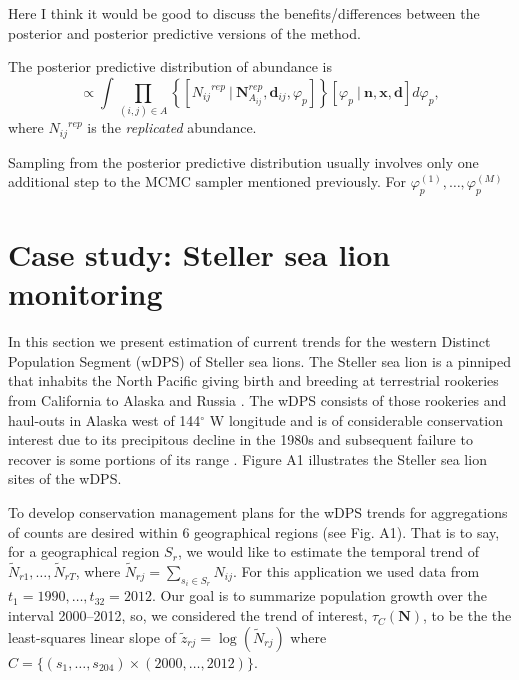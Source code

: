 \documentclass[12pt,letter]{article}
\newcommand{\Nij}{\ensuremath{N_{ij}}}
\newcommand{\dij}{\ensuremath{\mathbf{d}_{ij}}}
\begin{document}
Here I think it would be good to discuss the benefits/differences between the posterior and posterior predictive versions of the method.

The posterior predictive distribution of abundance is
\begin{equation}
[\mathbf{N}^{rep}|\mathbf{n}] \propto \int \prod_{(i,j)\in A}\left\{[\Nij^{rep}\ |\ \mathbf{N}_{A_{ij}}^{rep}, \dij, \varphi_p]\right\}[\varphi_p\ |\ \mathbf{n}, \mathbf{x}, \mathbf{d}]d\varphi_p,\end{equation} 
where $\Nij^{rep}$ is the {\em replicated} abundance. 

Sampling from the posterior predictive distribution usually involves only one additional step to the MCMC sampler mentioned previously. For  $\varphi_p^{(1)},\dots,\varphi_p^{(M)}$ 


\section{Case study: Steller sea lion monitoring}

In this section we present estimation of current trends for the western Distinct Population Segment (wDPS) of Steller sea lions. The Steller sea lion is a pinniped that inhabits the North Pacific giving birth and breeding at terrestrial rookeries from California to Alaska and Russia \citep{}. The wDPS consists of those rookeries and haul-outs in Alaska west of 144$^\circ$ W longitude and is of considerable conservation interest due to its precipitous decline in the 1980s and subsequent failure to recover is some portions of its range \citep{}. Figure A1 illustrates the Steller sea lion sites of the wDPS.

To develop conservation management plans for the wDPS trends for aggregations of counts are desired within 6 geographical regions \citep{}(see Fig. A1). That is to say, for a geographical region $S_r$, we would like to estimate the temporal trend of $\tilde N_{r1},\dots,\tilde N_{rT}$, where $\tilde N_{rj} = \sum_{s_i \in S_r} N_{ij}$. For this application we used data from $t_1=1990,\dots,t_{32}=2012$. Our goal is to summarize population growth over the interval 2000--2012, so, we considered the trend of interest, $\tau_C(\mathbf{N})$, to be the the least-squares linear slope of $\tilde z_{rj} = \log(\tilde N_{rj})$ where $C=\{(s_1,\dots,s_{204}) \times (2000,\dots,2012)\}$. 
\end{document}
